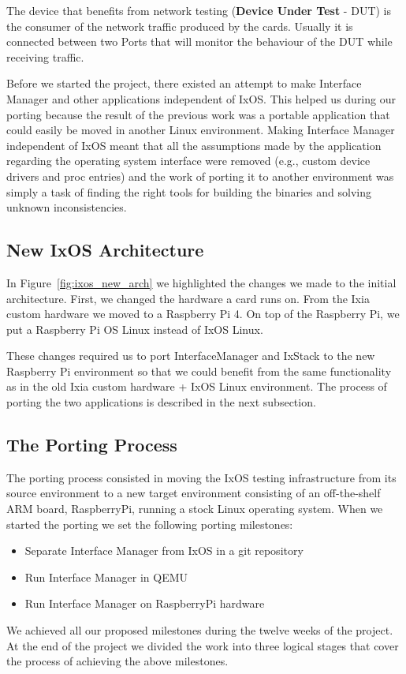 The device that benefits from network testing (\textbf{Device Under Test} - DUT)
is the consumer
of the network traffic produced by the cards. Usually it is connected between
two Ports that will monitor the behaviour of the DUT while receiving traffic.

Before we started the project, there existed an attempt to make Interface Manager
and other applications independent of IxOS. This helped us during our porting
because the result of the previous work was a portable application that could
easily be moved in another Linux environment. Making Interface Manager
independent of IxOS meant that all the assumptions made by the application
regarding the operating system interface were removed (e.g., custom device
drivers and proc entries) and the work of porting it to another environment
was simply a task of finding the right tools for building the binaries and
solving unknown inconsistencies.

\subsection{New IxOS Architecture}

\begin{figure*}
    \centering
    \def\svgscale{0.95}
    
    \caption{New IxOS architecture}
    \label{fig:ixos_new_arch}
\end{figure*}

In Figure~\ref{fig:ixos_new_arch} we highlighted the changes we made to the
initial architecture. First, we changed the hardware a card runs on. From the
Ixia custom hardware we moved to a Raspberry Pi 4. On top of the Raspberry Pi,
we put a Raspberry Pi OS Linux instead of IxOS Linux.

These changes required us to port InterfaceManager and IxStack to the new
Raspberry Pi environment so that we could benefit from the same functionality as in the
old Ixia custom hardware + IxOS Linux environment. The process of porting the
two applications is described in the next subsection.

\subsection{The Porting Process}

The porting process consisted in moving the IxOS testing infrastructure from its
source environment to a new target environment consisting of an off-the-shelf
ARM board, RaspberryPi, running a stock Linux operating system. When we started
the porting we set the following porting milestones:
\begin{itemize}
    \item Separate Interface Manager from IxOS in a git repository
    \item Run Interface Manager in QEMU
    \item Run Interface Manager on RaspberryPi hardware
\end{itemize}
We achieved all our proposed milestones during the twelve weeks of the project.
At the end of the project we divided the work into three logical stages
that cover the process of achieving the above milestones.


